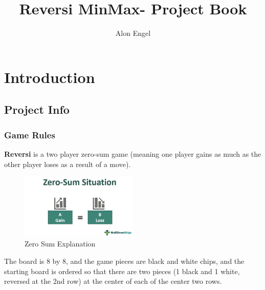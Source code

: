\documentclass[12pt,a4paper, openany]{report}
\author{Alon Engel}
\title{Reversi MinMax- Project Book}
\begin{document}
\maketitle

\tableofcontents

\part{Introduction}

\chapter[Chapter Title]{\centering Project Info}

\section{Game Rules}
\textbf{Reversi} is a two player zero-sum game (meaning one player gains as much as the other player loses as a result of a move). 

\begin{figure}[ht]
\begin{center}
\includegraphics[scale=0.25, width=0.5\textwidth]{Zero-sum-Situation}
\caption{Zero Sum Explanation}
\end{center}
\end{figure}

\pagebreak{}
The board is 8 by 8, and the game pieces are black and white chips, and the starting board is ordered so that there are two pieces (1 black and 1 white, reversed at the 2nd row) at the center of each of the center two rows.
\end{document}
